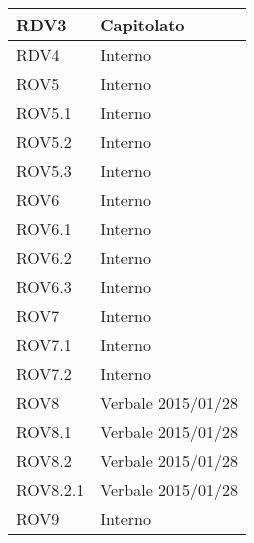 \begin{center}
\begin{longtable}{| p{4cm} | p{4cm} |}
\hline
RDV3   &  Capitolato \\
\hline
RDV4   &  Interno \\
\hline
ROV5   &  Interno \\
\hline
ROV5.1   &  Interno \\
\hline
ROV5.2   &  Interno \\
\hline
ROV5.3   &  Interno \\
\hline
ROV6   &  Interno \\
\hline
ROV6.1   &  Interno \\
\hline
ROV6.2   &  Interno \\
\hline
ROV6.3   &  Interno \\
\hline
ROV7   &  Interno \\
\hline
ROV7.1   &  Interno \\
\hline
ROV7.2   &  Interno \\
\hline
ROV8   &  Verbale 2015/01/28 \\
\hline
ROV8.1   &  Verbale 2015/01/28 \\
\hline
ROV8.2   &  Verbale 2015/01/28 \\
\hline
ROV8.2.1   &  Verbale 2015/01/28 \\
\hline
ROV9   &  Interno \\
\hline
\end{longtable}
\egroup
\end{center}
